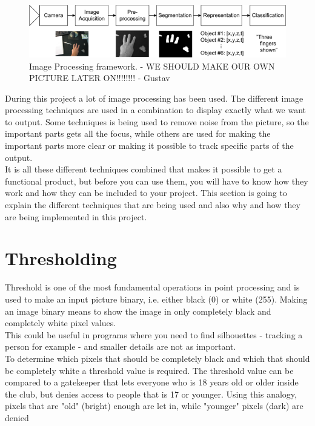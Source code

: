\begin{figure}[htbp]
\centering
\includegraphics[width=1.00\textwidth]{Pictures/Theory/imageProcessing_steps.png}
\caption{Image Processing framework. - WE SHOULD MAKE OUR OWN PICTURE LATER ON!!!!!!!! - Gustav}
\label{fig:ip_framework}
\end{figure}

During this project a lot of image processing has been used. The different image processing techniques are used in a combination to display exactly what we want to output. Some techniques is being used to remove noise from the picture, so the important parts gets all the focus, while others are used for making the important parts more clear or making it possible to track specific parts of the output. \\
It is all these different techniques combined that makes it possible to get a functional product, but before you can use them, you will have to know how they work and how they can be included to your project. This section is going to explain the different techniques that are being used and also why and how they are being implemented in this project.

\section{Thresholding}
Threshold is one of the most fundamental operations in point processing  and is used to make an input picture binary, i.e. either black (0) or white (255). Making an image binary means to show the image in only completely black and completely white pixel values. \\
This could be useful in programs where you need to find silhouettes - tracking a person for example - and smaller details are not as important. \\
To determine which pixels that should be completely black and which that should be completely white a threshold value is required. The threshold value can be compared to a gatekeeper that lets everyone who is 18 years old or older inside the club, but denies access to people that is 17 or younger. Using this analogy, pixels that are "old" (bright) enough are let in, while "younger" pixels (dark) are denied

